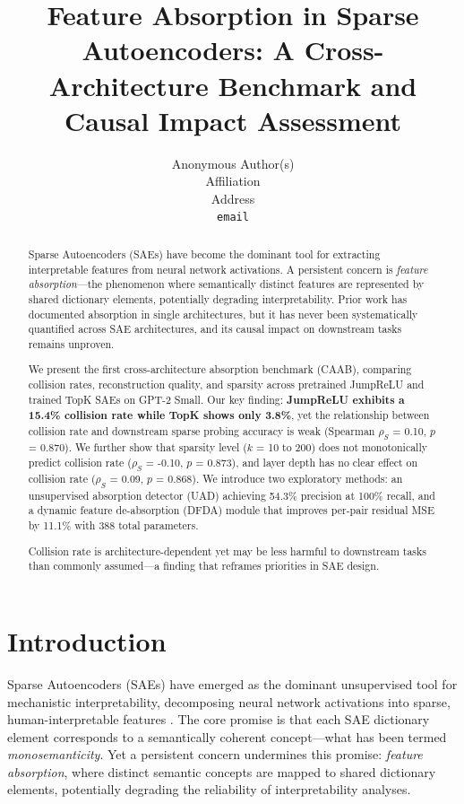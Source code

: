 \documentclass{article}
\title{Feature Absorption in Sparse Autoencoders: A Cross-Architecture Benchmark and Causal Impact Assessment}
\author{%
  Anonymous Author(s) \\
  Affiliation \\
  Address \\
  \texttt{email} \\
}
\begin{document}
\maketitle

\begin{abstract}
Sparse Autoencoders (SAEs) have become the dominant tool for extracting interpretable features from neural network activations. A persistent concern is \textit{feature absorption}---the phenomenon where semantically distinct features are represented by shared dictionary elements, potentially degrading interpretability. Prior work has documented absorption in single architectures, but it has never been systematically quantified across SAE architectures, and its causal impact on downstream tasks remains unproven.

We present the first cross-architecture absorption benchmark (CAAB), comparing collision rates, reconstruction quality, and sparsity across pretrained JumpReLU and trained TopK SAEs on GPT-2 Small. Our key finding: \textbf{JumpReLU exhibits a 15.4\% collision rate while TopK shows only 3.8\%}, yet the relationship between collision rate and downstream sparse probing accuracy is weak (Spearman $\rho_S$ = 0.10, $p$ = 0.870). We further show that sparsity level ($k$ = 10 to 200) does not monotonically predict collision rate ($\rho_S$ = -0.10, $p$ = 0.873), and layer depth has no clear effect on collision rate ($\rho_S$ = 0.09, $p$ = 0.868). We introduce two exploratory methods: an unsupervised absorption detector (UAD) achieving 54.3\% precision at 100\% recall, and a dynamic feature de-absorption (DFDA) module that improves per-pair residual MSE by 11.1\% with 388 total parameters.

Collision rate is architecture-dependent yet may be less harmful to downstream tasks than commonly assumed---a finding that reframes priorities in SAE design.
\end{abstract}

\section{Introduction}

Sparse Autoencoders (SAEs) have emerged as the dominant unsupervised tool for mechanistic interpretability, decomposing neural network activations into sparse, human-interpretable features \citep{bricken2023monosemanticity, cunningham2023sparse}. The core promise is that each SAE dictionary element corresponds to a semantically coherent concept---what has been termed \textit{monosemanticity}. Yet a persistent concern undermines this promise: \textit{feature absorption}, where distinct semantic concepts are mapped to shared dictionary elements, potentially degrading the reliability of interpretability analyses.
\end{document}
